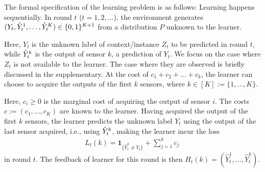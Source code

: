 The formal specification of the learning problem is as follows:
Learning happens sequentially.
In round $t$ ($t=1,2,\dots$), 
the environment generates 
$(Y_t,\hat{Y}_t^1,\dots,\hat{Y}_t^K)\in \{0,1\}^{K+1}$ from a distribution $P$ unknown to the learner.

Here, $Y_t$ is the unknown label of context/instance $Z_t$ to be predicted in round $t$, while $\hat{Y}_t^k$ is the output of sensor
$k$, a prediction of $Y_t$. We focus on the case where $Z_t$ is not available to the learner. The case where they are observed is briefly discussed in the supplementary. 
At the cost of $c_1+ c_2 + \dots + c_k$,
the learner can choose to acquire the outputs of the first $k$ sensors,
where $k\in [K] := \{1,\dots,K\}$. 

Here, $c_i\ge 0$ is the marginal cost of acquiring the output of sensor $i$.
The costs $c := (c_1,\dots,c_K)$ are known to the learner.
Having acquired the output of the first $k$ sensors, the learner predicts the unknown label $Y_t$ using
the output of the last sensor acquired, i.e., using $\hat{Y}_t^k$, making the learner incur the loss
\begin{align*}
L_t(k)=\mathbf{1}_{\{\hat{Y}^k_t\neq Y_t\}}+\sum_{j=1}^k c_j\,
\end{align*}
in round $t$.
The feedback of learner for this round is then $H_t(k)=(\hat{Y}^1_t,\ldots,\hat{Y}^k_t)$.



